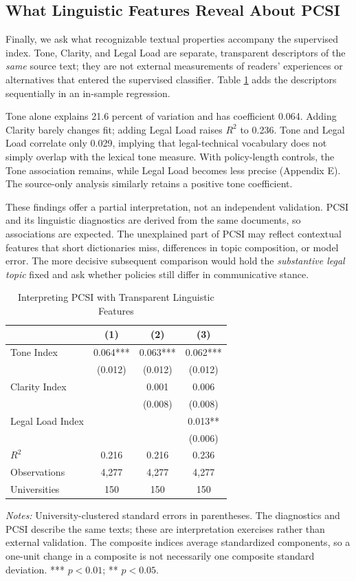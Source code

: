 \documentclass[11pt]{article}
\begin{document}
\subsection{What Linguistic Features Reveal About PCSI}
Finally, we ask what recognizable textual properties accompany the supervised index. Tone, Clarity, and Legal Load are separate, transparent descriptors of the \emph{same} source text; they are not external measurements of readers' experiences or alternatives that entered the supervised classifier. Table \ref{tab:lingreg} adds the descriptors sequentially in an in-sample regression.

Tone alone explains 21.6 percent of variation and has coefficient 0.064. Adding Clarity barely changes fit; adding Legal Load raises $R^2$ to 0.236. Tone and Legal Load correlate only 0.029, implying that legal-technical vocabulary does not simply overlap with the lexical tone measure. With policy-length controls, the Tone association remains, while Legal Load becomes less precise (Appendix E). The source-only analysis similarly retains a positive tone coefficient.

These findings offer a partial interpretation, not an independent validation. PCSI and its linguistic diagnostics are derived from the same documents, so associations are expected. The unexplained part of PCSI may reflect contextual features that short dictionaries miss, differences in topic composition, or model error. The more decisive subsequent comparison would hold the \emph{substantive legal topic} fixed and ask whether policies still differ in communicative stance.

\begin{table}[htbp]\centering\caption{Interpreting PCSI with Transparent Linguistic Features}\label{tab:lingreg}\small\begin{tabular}{lccc}\toprule &(1)&(2)&(3)\\\midrule
Tone Index&0.064***&0.063***&0.062***\\&(0.012)&(0.012)&(0.012)\\Clarity Index&&0.001&0.006\\&&(0.008)&(0.008)\\Legal Load Index&&&0.013**\\&&&(0.006)\\$R^2$&0.216&0.216&0.236\\Observations&4,277&4,277&4,277\\Universities&150&150&150\\\bottomrule\end{tabular}
\par\smallskip\begin{minipage}{.9\linewidth}\footnotesize\emph{Notes:} University-clustered standard errors in parentheses. The diagnostics and PCSI describe the same texts; these are interpretation exercises rather than external validation. The composite indices average standardized components, so a one-unit change in a composite is not necessarily one composite standard deviation. *** $p<0.01$; ** $p<0.05$.\end{minipage}\end{table}
\end{document}
